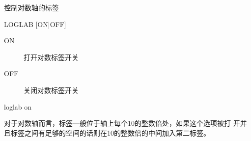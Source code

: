 \label{cmd:loglab}

控制对数轴的标签

\begin{SACSTX}
LOGLAB [ON|OFF]
\end{SACSTX}

\begin{description}
\item [ON] 打开对数标签开关
\item [OFF] 关闭对数标签开关
\end{description}

\begin{SACDFT}
loglab on
\end{SACDFT}

对于对数轴而言，标签一般位于轴上每个10的整数倍处，如果这个选项被打
开并且标签之间有足够的空间的话则在10的整数倍的中间加入第二标签。

